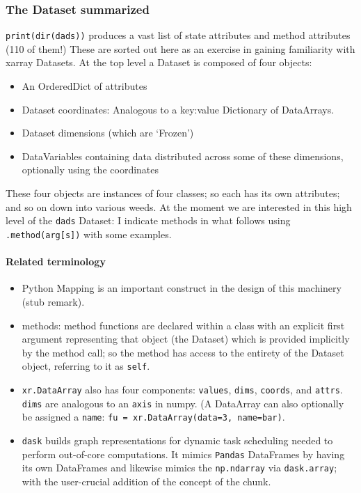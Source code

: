 \documentclass[11pt]{article}
\providecommand{\tightlist}{%
      \setlength{\itemsep}{0pt}\setlength{\parskip}{0pt}}
\begin{document}
    \hypertarget{the-dataset-summarized}{%
\subsubsection{The Dataset summarized}\label{the-dataset-summarized}}

\texttt{print(dir(dads))} produces a vast list of state attributes and
method attributes (110 of them!) These are sorted out here as an
exercise in gaining familiarity with xarray Datasets. At the top level a
Dataset is composed of four objects:

\begin{itemize}
\tightlist
\item
  An OrderedDict of attributes
\item
  Dataset coordinates: Analogous to a key:value Dictionary of
  DataArrays.
\item
  Dataset dimensions (which are `Frozen')
\item
  DataVariables containing data distributed across some of these
  dimensions, optionally using the coordinates
\end{itemize}

These four objects are instances of four classes; so each has its own
attributes; and so on down into various weeds. At the moment we are
interested in this high level of the \texttt{dads} Dataset: I indicate
methods in what follows using \texttt{.method(arg{[}s{]})} with some
examples.

\hypertarget{related-terminology}{%
\paragraph{Related terminology}\label{related-terminology}}

\begin{itemize}
\tightlist
\item
  Python Mapping is an important construct in the design of this
  machinery (stub remark).
\item
  methods: method functions are declared within a class with an explicit
  first argument representing that object (the Dataset) which is
  provided implicitly by the method call; so the method has access to
  the entirety of the Dataset object, referring to it as \texttt{self}.
\item
  \texttt{xr.DataArray} also has four components: \texttt{values},
  \texttt{dims}, \texttt{coords}, and \texttt{attrs}. \texttt{dims} are
  analogous to an \texttt{axis} in numpy. (A DataArray can also
  optionally be assigned a \texttt{name}:
  \texttt{fu\ =\ xr.DataArray(data=3,\ name=\textquotesingle{}bar\textquotesingle{})}.
\item
  \texttt{dask} builds graph representations for dynamic task scheduling
  needed to perform out-of-core computations. It mimics \texttt{Pandas}
  DataFrames by having its own DataFrames and likewise mimics the
  \texttt{np.ndarray} via \texttt{dask.array}; with the user-crucial
  addition of the concept of the chunk.
\end{itemize}
\end{document}
